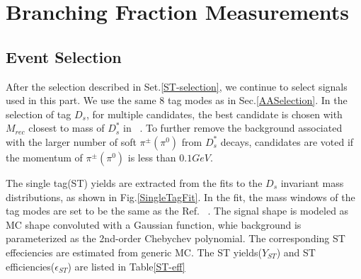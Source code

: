 \section{Branching Fraction Measurements}

\subsection{Event Selection}
\label{BFSelection}
After the selection described in Set.\ref{ST-selection}, we continue to select signals used in this part. 
We use the same 8 tag modes as in Sec.\ref{AASelection}.
In the selection of tag $D_{s}$, for multiple candidates, the best candidate is chosen with $M_{rec}$ closest to mass of $D_{s}^{*}$ in ~\cite{PDG2018}.
To further remove the background associated with the larger number of soft $\pi^{\pm}(\pi^{0})$ from $D_{s}^{*}$ decays, candidates are voted if the momentum of $\pi^{\pm}(\pi^{0})$ is less than $0.1GeV$.

The single tag(ST) yields are extracted from the fits to the $D_{s}$ invariant mass distributions, as shown in Fig.\ref{SingleTagFit}. In the fit, the mass windows of the tag modes are set to be the same as the Ref. ~\cite{Doc-DB-630-v35}.
The signal shape is modeled as MC shape convoluted with a Gaussian function, whie background is parameterized as the 2nd-order Chebychev polynomial.
The corresponding ST effeciencies are estimated from generic MC. The ST yields($Y_{ST}$) and ST efficiencies($\epsilon_{ST}$) are listed in Table\ref{ST-eff}

